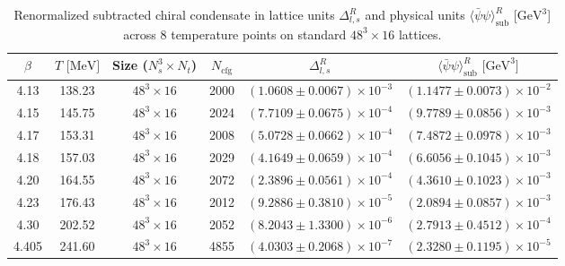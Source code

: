\documentclass[11pt,a4paper]{article}
\begin{document}
\begin{table}[H]
\centering
\small
\setlength{\tabcolsep}{7pt}
\caption{Renormalized subtracted chiral condensate in lattice units $\Delta_{l, s}^R$ and physical units $\langle\bar{\psi}\psi\rangle_{\text{sub}}^R$ [$\text{GeV}^3$] across 8 temperature points on standard $48^3 \times 16$ lattices.}
\label{tab:condensate_standard}
\begin{tabular}{cccccc}
\toprule
$\beta$ & $T\text{ [MeV]}$ & Size ($N_s^3 \times N_t$) & $N_{\text{cfg}}$ & $\Delta_{l, s}^R$ & $\langle\bar{\psi}\psi\rangle_{\text{sub}}^R\text{ [GeV}^3\text{]}$ \\
\midrule
4.13  & 138.23 & $48^3 \times 16$ & 2000 & $(1.0608 \pm 0.0067) \times 10^{-3}$ & $(1.1477 \pm 0.0073) \times 10^{-2}$ \\
4.15  & 145.75 & $48^3 \times 16$ & 2024 & $(7.7109 \pm 0.0675) \times 10^{-4}$ & $(9.7789 \pm 0.0856) \times 10^{-3}$ \\
4.17  & 153.31 & $48^3 \times 16$ & 2008 & $(5.0728 \pm 0.0662) \times 10^{-4}$ & $(7.4872 \pm 0.0978) \times 10^{-3}$ \\
4.18  & 157.03 & $48^3 \times 16$ & 2029 & $(4.1649 \pm 0.0659) \times 10^{-4}$ & $(6.6056 \pm 0.1045) \times 10^{-3}$ \\
4.20  & 164.55 & $48^3 \times 16$ & 2072 & $(2.3896 \pm 0.0561) \times 10^{-4}$ & $(4.3610 \pm 0.1023) \times 10^{-3}$ \\
4.23  & 176.43 & $48^3 \times 16$ & 2012 & $(9.2886 \pm 0.3810) \times 10^{-5}$ & $(2.0894 \pm 0.0857) \times 10^{-3}$ \\
4.30  & 202.52 & $48^3 \times 16$ & 2052 & $(8.2043 \pm 1.3300) \times 10^{-6}$ & $(2.7913 \pm 0.4512) \times 10^{-4}$ \\
4.405 & 241.60 & $48^3 \times 16$ & 4855 & $(4.0303 \pm 0.2068) \times 10^{-7}$ & $(2.3280 \pm 0.1195) \times 10^{-5}$ \\
\bottomrule
\end{tabular}
\end{table}
\end{document}
